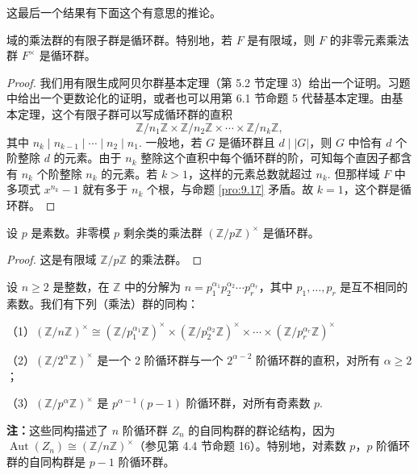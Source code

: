 这最后一个结果有下面这个有意思的推论。

\begin{proposition}\label{pro:9.18}
域的乘法群的有限子群是循环群。特别地，若 \(F\) 是有限域，则 \(F\) 的非零元素乘法群 \(F^\times\) 是循环群。
\end{proposition}

\begin{proof}
我们用有限生成阿贝尔群基本定理（第 5.2 节定理 3）给出一个证明。习题中给出一个更数论化的证明，或者也可以用第 6.1 节命题 5 代替基本定理。由基本定理，这个有限子群可以写成循环群的直积
\[
\mathbb{Z}/n_1\mathbb{Z} \times \mathbb{Z}/n_2\mathbb{Z} \times \cdots \times \mathbb{Z}/n_k\mathbb{Z},
\]
其中 \(n_k \mid n_{k-1} \mid \cdots \mid n_2 \mid n_1\). 一般地，若 \(G\) 是循环群且 \(d \mid |G|\)，则 \(G\) 中恰有 \(d\) 个阶整除 \(d\) 的元素。由于 \(n_k\) 整除这个直积中每个循环群的阶，可知每个直因子都含有 \(n_k\) 个阶整除 \(n_k\) 的元素。若 \(k > 1\)，这样的元素总数就超过 \(n_k\). 但那样域 \(F\) 中多项式 \(x^{n_k}-1\) 就有多于 \(n_k\) 个根，与命题 \ref{pro:9.17} 矛盾。故 \(k = 1\)，这个群是循环群。
\end{proof}

\begin{corollary}\label{cor:9.19}
设 \(p\) 是素数。非零模 \(p\) 剩余类的乘法群 \((\mathbb{Z}/p\mathbb{Z})^\times\) 是循环群。
\end{corollary}

\begin{proof}
这是有限域 \(\mathbb{Z}/p\mathbb{Z}\) 的乘法群。
\end{proof}

\begin{corollary}\label{cor:9.20}
设 \(n \geq 2\) 是整数，在 \(\mathbb{Z}\) 中的分解为 \(n = p_1^{\alpha_1}p_2^{\alpha_2}\cdots p_r^{\alpha_r}\)，其中 \(p_1, \ldots, p_r\) 是互不相同的素数。我们有下列（乘法）群的同构：

（1）\((\mathbb{Z}/n\mathbb{Z})^\times \cong (\mathbb{Z}/p_1^{\alpha_1}\mathbb{Z})^\times \times (\mathbb{Z}/p_2^{\alpha_2}\mathbb{Z})^\times \times \cdots \times (\mathbb{Z}/p_r^{\alpha_r}\mathbb{Z})^\times\)

（2）\((\mathbb{Z}/2^\alpha\mathbb{Z})^\times\) 是一个 2 阶循环群与一个 \(2^{\alpha-2}\) 阶循环群的直积，对所有 \(\alpha \geq 2\)；

（3）\((\mathbb{Z}/p^\alpha\mathbb{Z})^\times\) 是 \(p^{\alpha-1}(p-1)\) 阶循环群，对所有奇素数 \(p\).
\end{corollary}

\noindent\textbf{注：}这些同构描述了 \(n\) 阶循环群 \(Z_n\) 的自同构群的群论结构，因为 \(\operatorname{Aut}(Z_n) \cong (\mathbb{Z}/n\mathbb{Z})^\times\)（参见第 4.4 节命题 16）。特别地，对素数 \(p\)，\(p\) 阶循环群的自同构群是 \(p-1\) 阶循环群。


